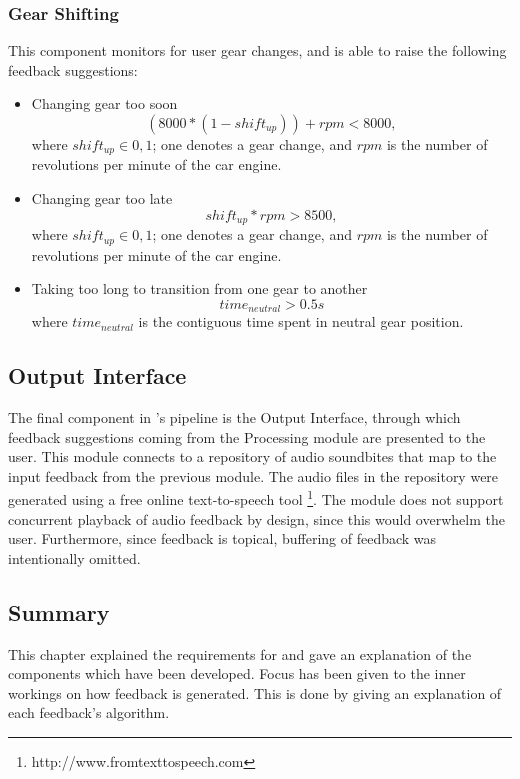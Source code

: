 \subsubsection{Gear Shifting}
This component monitors for user gear changes, and is able to raise the following feedback suggestions:
\begin{itemize}
	\item Changing gear too soon
	\begin{equation}
		(8000 * (1 - shift_{up})) + rpm < 8000,
	\end{equation}
	where $shift_{up} \in {0,1}$; one denotes a gear change, and $rpm$ is the number of revolutions per minute of the car engine.	
	\item Changing gear too late
	\begin{equation}
		shift_{up} * rpm > 8500,
	\end{equation}
	where $shift_{up} \in {0,1}$; one denotes a gear change, and $rpm$ is the number of revolutions per minute of the car engine.
	\item Taking too long to transition from one gear to another
	\begin{equation}
		time_{neutral} > 0.5s
	\end{equation}
	where $time_{neutral}$ is the contiguous time spent in neutral gear position.
\end{itemize}

\subsection{Output Interface}
The final component in \methodname's pipeline is the Output Interface, through which feedback suggestions coming from the Processing module are presented to the user. This module connects to a repository of audio soundbites that map to the input feedback from the previous module. The audio files in the repository were generated using a free online text-to-speech tool \footnote{http://www.fromtexttospeech.com}. The module does not support concurrent playback of audio feedback by design, since this would overwhelm the user. Furthermore, since feedback is topical, buffering of feedback was intentionally omitted.

\subsection{Summary}
This chapter explained the requirements for \methodname and gave an explanation of the components which have been developed. Focus has been given to the inner workings on how feedback is generated. This is done by giving an explanation of each feedback's algorithm.